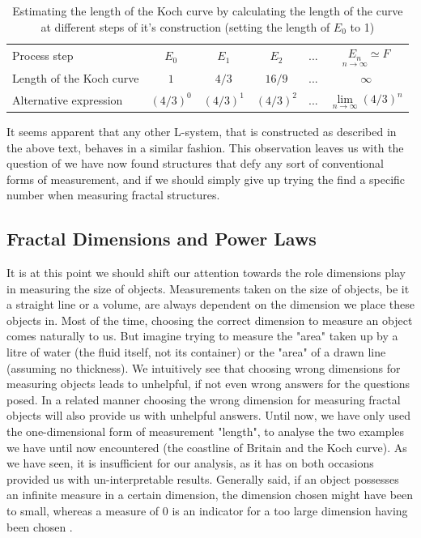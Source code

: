 \documentclass{article}[12pt]
\begin{document}
\begin{table}[]
\begin{tabular}{p{2.5cm}ccccc}
&&&&&\\
\hline
\hline
Process step &  $E_0$ & $E_1$ & $E_2$ &  $ ... $ &$\underset{n \to \infty}{E_n} \simeq F$\\
\hline
Length of the Koch curve & $1$ & $4/3$ & $16/9$ & $ ... $ & $\infty$\\
Alternative \newline expression & $ (4/3)^0 $ & $(4/3)^1$  & $(4/3)^2$  & $...$ & $\underset{n \to \infty}{\lim}(4/3)^n$ \\
\hline
\hline
\end{tabular}
\caption{Estimating the length of the Koch curve by calculating the length of the curve at different steps of it's construction (setting the length of $E_0$ to 1)}
\label{table:koch_length}
\end{table}

It seems apparent that any other L-system, that is constructed as described in the above text, behaves in a similar fashion. This observation leaves us with the question of we have now found structures that defy any sort of conventional forms of measurement, and if we should simply give up trying the find a specific number when measuring fractal structures.

\subsection{Fractal Dimensions and Power Laws}
It is at this point we should shift our attention towards the role dimensions play in measuring the size of objects. Measurements taken on the size of objects, be it a straight line or a volume, are always dependent on the dimension we place these objects in. Most of the time, choosing the correct dimension to measure an object comes naturally to us. But imagine trying to measure the "area" taken up by a litre of water (the fluid itself, not its container) or the "area" of a drawn line (assuming no thickness). We intuitively see that choosing wrong dimensions for measuring objects leads to unhelpful, if not even wrong answers for the questions posed.
In a related manner choosing the wrong dimension for measuring fractal objects will also provide us with unhelpful answers. Until now, we have only used the one-dimensional form of measurement "length", to analyse the two examples we have until now encountered (the coastline of Britain and the Koch curve). As we have seen, it is insufficient for our analysis, as it has on both occasions provided us with un-interpretable results. Generally said, if an object possesses an infinite measure in a certain dimension, the dimension chosen might have been to small, whereas a measure of $0$ is an indicator for a too large dimension having been chosen \citep{falconer2013fractals}.
\end{document}
